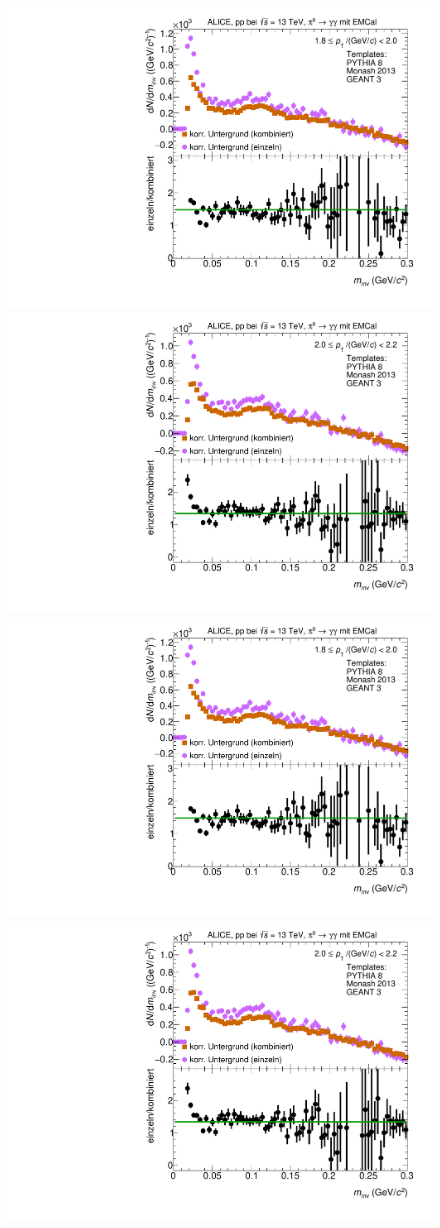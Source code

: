 \begin{figure}[t]
\begin{multicols}{2}
\end{multicols}
\begin{multicols}{2}
    \includegraphics[width=.65\linewidth]{Anhang/BackgroundWithRatio03_Data_2016.pdf}\par
    \includegraphics[width=.65\linewidth]{Anhang/BackgroundWithRatio04_Data_2016.pdf}\par
\end{multicols}
\begin{multicols}{2}
    \includegraphics[width=.65\linewidth]{Anhang/BackgroundWithRatio03_Data_2016.pdf}\par
    \includegraphics[width=.65\linewidth]{Anhang/BackgroundWithRatio04_Data_2016.pdf}\par

\end{multicols}
\end{figure}

